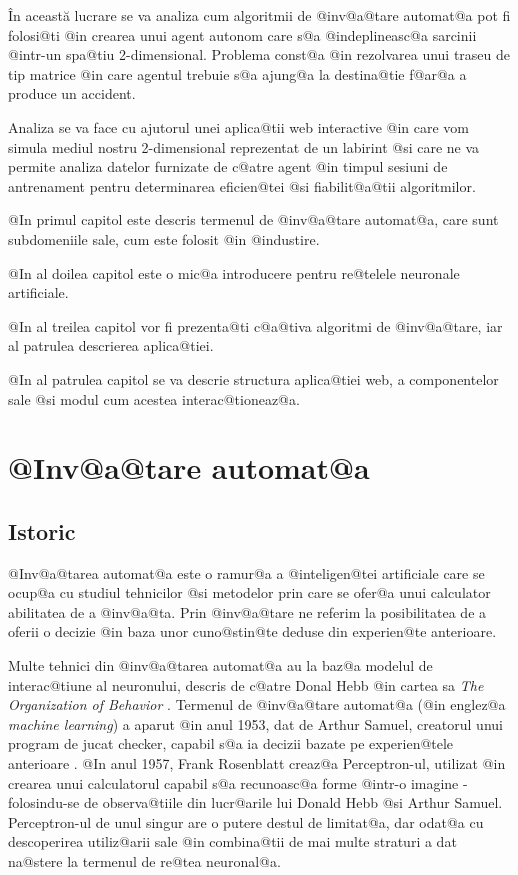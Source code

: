 \^ In aceast\u a lucrare se va analiza cum algoritmii de @inv@a@tare automat@a  pot fi folosi@ti @in crearea unui agent autonom care s@a @indeplineasc@a sarcinii @intr-un spa@tiu 2-dimensional. Problema const@a @in rezolvarea unui traseu de tip matrice @in care agentul trebuie s@a ajung@a la destina@tie f@ar@a a produce un accident.

Analiza se va face cu ajutorul unei aplica@tii web interactive @in care vom simula mediul nostru 2-dimensional reprezentat de un labirint @si care ne va permite analiza datelor furnizate de c@atre agent @in timpul sesiuni de antrenament pentru determinarea eficien@tei @si fiabilit@a@tii algoritmilor.


\hspace{0.2cm}

@In primul capitol este descris termenul de @inv@a@tare automat@a, care sunt subdomeniile sale, cum este folosit @in @industire. 

@In al doilea capitol este o mic@a introducere pentru re@telele neuronale artificiale.

@In al treilea capitol vor fi prezenta@ti c@a@tiva algoritmi de @inv@a@tare, iar al patrulea descrierea aplica@tiei.

@In al patrulea capitol se va descrie structura aplica@tiei web, a componentelor sale @si modul cum acestea interac@tioneaz@a.

\newpage

\chapter{ @Inv@a@tare automat@a }

\section{Istoric}

	@Inv@a@tarea automat@a este o ramur@a a @inteligen@tei artificiale care se ocup@a cu studiul tehnicilor @si metodelor prin care se ofer@a unui calculator abilitatea de a @inv@a@ta. Prin @inv@a@tare ne referim la posibilitatea de a oferii o decizie @in baza unor cuno@stin@te deduse din experien@te anterioare.

 Multe tehnici din @inv@a@tarea automat@a au la baz@a modelul de interac@tiune al neuronului, descris de c@atre Donal Hebb @in cartea sa {\sl The Organization of Behavior} \cite{donald-hebb-book}. Termenul de @inv@a@tare automat@a (@in englez@a {\sl machine learning}) a aparut @in anul 1953, dat de Arthur Samuel, creatorul unui program de jucat checker, capabil s@a ia decizii bazate pe experien@tele anterioare \cite{arthur-samuel}. @In anul 1957, Frank Rosenblatt creaz@a Perceptron-ul, utilizat @in crearea unui calculatorul capabil s@a recunoasc@a forme @intr-o imagine - folosindu-se de observa@tiile din lucr@arile lui Donald Hebb @si Arthur Samuel. Perceptron-ul de unul singur are o putere destul de limitat@a, dar odat@a cu descoperirea utiliz@arii sale @in combina@tii de mai multe straturi a dat na@stere la termenul de re@tea neuronal@a. 
 
